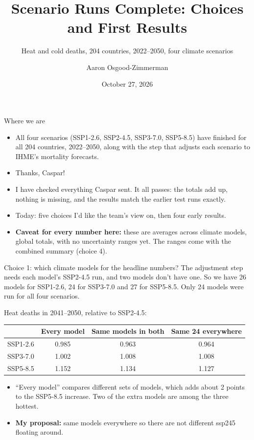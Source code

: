 \documentclass[aspectratio=169,11pt]{beamer}
\title{Scenario Runs Complete: Choices and First Results}
\subtitle{Heat and cold deaths, 204 countries, 2022--2050, four climate scenarios}
\author{Aaron Osgood-Zimmerman}
\institute{OZ Labs, for the World Bank}
\date{October 27, 2026}
\begin{document}
\begin{frame}
  \titlepage
\end{frame}

\begin{frame}{Where we are}
  \begin{itemize}
    \item All four scenarios (SSP1-2.6, SSP2-4.5, SSP3-7.0, SSP5-8.5) have
      finished for all 204 countries, 2022--2050, along with the step that
      adjusts each scenario to IHME's mortality forecasts.
    \item Thanks, Caspar!
    \item I have checked everything Caspar sent. It all passes: the totals
      add up, nothing is missing, and the results match the earlier test
      runs exactly.
    \item Today: five choices I'd like the team's view on, then four early
      results.
    \item \textbf{Caveat for every number here:} these are averages across
      climate models, global totals, with no uncertainty ranges yet. The
      ranges come with the combined summary (choice 4).
  \end{itemize}
\end{frame}

\begin{frame}{Choice 1: which climate models for the headline numbers?}
  \small
  The adjustment step needs each model's SSP2-4.5 run, and two models don't
  have one. So we have 26 models for SSP1-2.6, 24 for SSP3-7.0 and 27 for
  SSP5-8.5. Only 24 models were run for all four scenarios.

  \medskip
  Heat deaths in 2041--2050, relative to SSP2-4.5:

  \medskip
  \centering
  \begin{tabular}{lccc}
    \toprule
    & Every model & Same models in both & Same 24 everywhere \\
    \midrule
    SSP1-2.6 & 0.985 & 0.963 & 0.964 \\
    SSP3-7.0 & 1.002 & 1.008 & 1.008 \\
    SSP5-8.5 & 1.152 & 1.134 & 1.127 \\
    \bottomrule
  \end{tabular}

  \medskip
  \raggedright
  \begin{itemize}
    \item ``Every model'' compares different sets of models, which adds about
      2 points to the SSP5-8.5 increase. Two of the extra models are among the
      three hottest.
    \item \textbf{My proposal:} same models everywhere so there are not different ssp245 floating around.
  \end{itemize}
\end{frame}
\end{document}
